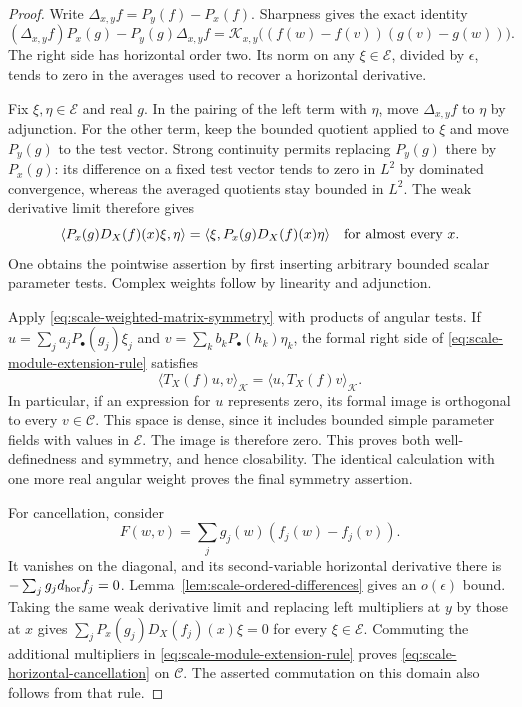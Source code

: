 \begin{proof}
Write $\Delta_{x,y}f=P_y(f)-P_x(f)$.  Sharpness gives the exact identity
\[
 (\Delta_{x,y}f)P_x(g)-P_y(g)\Delta_{x,y}f
 =\mathcal K_{x,y}\bigl((f(w)-f(v))(g(v)-g(w))\bigr).
\]
The right side has horizontal order two.  Its norm on any
$\xi\in\mathscr E$, divided by $\epsilon$, tends to zero in the
averages used to recover a horizontal derivative.

Fix $\xi,\eta\in\mathscr E$ and real $g$.  In the pairing of the left
term with $\eta$, move $\Delta_{x,y}f$ to $\eta$ by adjunction.
For the other term, keep the bounded quotient applied to $\xi$ and
move $P_y(g)$ to the test vector.  Strong continuity permits replacing
$P_y(g)$ there by $P_x(g)$: its difference on a fixed test vector tends
to zero in $L^2$ by dominated convergence, whereas the averaged
quotients stay bounded in $L^2$.  The weak derivative limit therefore
gives
\begin{equation}\label{eq:scale-weighted-matrix-symmetry}
 \langle P_x(g)D_X(f)(x)\xi,\eta\rangle
 =\langle\xi,P_x(g)D_X(f)(x)\eta\rangle
 \quad\hbox{for almost every }x.
\end{equation}
One obtains the pointwise assertion by first inserting arbitrary
bounded scalar parameter tests.  Complex weights follow by linearity
and adjunction.

Apply \eqref{eq:scale-weighted-matrix-symmetry} with products of angular
tests.  If $u=\sum_j a_jP_{\bullet}(g_j)\xi_j$ and
$v=\sum_k b_kP_{\bullet}(h_k)\eta_k$, the formal right side of
\eqref{eq:scale-module-extension-rule} satisfies
\[
 \langle T_X(f)u,v\rangle_{\mathcal K}
 =\langle u,T_X(f)v\rangle_{\mathcal K}.
\]
In particular, if an expression for $u$ represents zero, its formal
image is orthogonal to every $v\in\mathcal C$.  This space is dense,
since it includes bounded simple parameter fields with values in
$\mathscr E$.  The image is therefore zero.  This proves both
well-definedness and symmetry, and hence closability.  The identical
calculation with one more real angular weight proves the final
symmetry assertion.

For cancellation, consider
\[
 F(w,v)=\sum_j g_j(w)(f_j(w)-f_j(v)).
\]
It vanishes on the diagonal, and its second-variable horizontal
derivative there is $-\sum_jg_jd_{\rm hor}f_j=0$.
Lemma~\ref{lem:scale-ordered-differences} gives an
$o(\epsilon)$ bound.  Taking the same weak derivative limit and
replacing left multipliers at $y$ by those at $x$ gives
$\sum_jP_x(g_j)D_X(f_j)(x)\xi=0$ for every $\xi\in\mathscr E$.
Commuting the additional multipliers in
\eqref{eq:scale-module-extension-rule} proves
\eqref{eq:scale-horizontal-cancellation} on $\mathcal C$.  The asserted
commutation on this domain also follows from that rule.
\end{proof}


